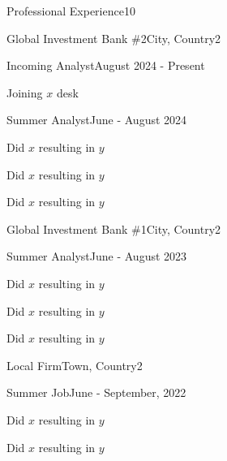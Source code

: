 \documentclass[10pt,a4paper]{CV}
\begin{document}
\begin{Section}{Professional Experience}{10}
    \begin{Institution}{Global Investment Bank \#2}{City, Country}{2}
        \begin{Position}{Incoming Analyst}{August 2024 - Present}
            \item Joining $x$ desk
            \vspace{-4pt}
        \end{Position}
        \begin{Position}{Summer Analyst}{June - August 2024}
            \item Did $x$ resulting in $y$
            \item Did $x$ resulting in $y$
            \item Did $x$ resulting in $y$
        \end{Position}
    \end{Institution}
    
    \begin{Institution}{Global Investment Bank \#1}{City, Country}{2}
        \begin{Position}{Summer Analyst}{June - August 2023}
            \item Did $x$ resulting in $y$
            \item Did $x$ resulting in $y$
            \item Did $x$ resulting in $y$
        \end{Position}
    \end{Institution}
    
    \begin{Institution}{Local Firm}{Town, Country}{2}
        \begin{Position}{Summer Job}{June - September, 2022}
            \item Did $x$ resulting in $y$
            \item Did $x$ resulting in $y$
        \end{Position}
    \end{Institution}
\end{Section}
\end{document}
